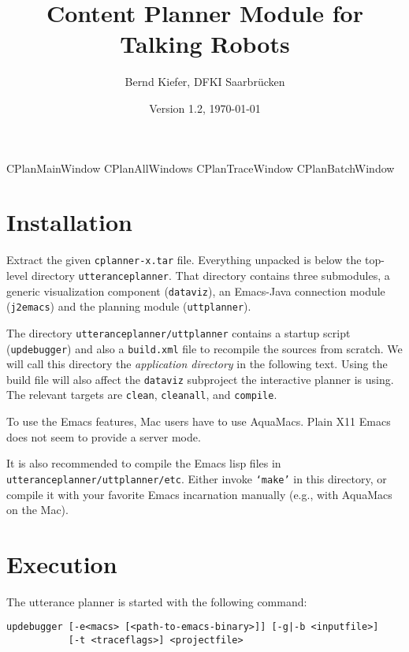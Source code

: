 \documentclass[11pt,a4paper]{article}
\title{\Large \bf Content Planner Module for Talking Robots}
\date{Version 1.2, \today}
\author{Bernd Kiefer, DFKI Saarbr\"ucken}
\begin{document}
\maketitle
\setlength{\parindent}{0em}

{CPlanMainWindow}
{CPlanAllWindows}
{CPlanTraceWindow}
{CPlanBatchWindow}

\section{Installation}

Extract the given \texttt{cplanner-x.tar} file. Everything unpacked is below
the top-level directory \texttt{utteranceplanner}. That directory contains
three submodules, a generic visualization component (\texttt{dataviz}), an
Emacs-Java connection module (\texttt{j2emacs}) and the planning module
(\texttt{uttplanner}).

The directory \texttt{utteranceplanner/uttplanner} contains a startup script
(\texttt{updebugger}) and also a \texttt{build.xml} file to recompile the
sources from scratch. We will call this directory the \emph{application
  directory} in the following text. Using the build file will also affect the
\texttt{dataviz} subproject the interactive planner is using. The relevant
targets are \texttt{clean}, \texttt{cleanall}, and \texttt{compile}.

To use the Emacs features, Mac users have to use AquaMacs. Plain X11 Emacs
does not seem to provide a server mode.

It is also recommended to compile the Emacs lisp files in \texttt{utteranceplanner/uttplanner/etc}. Either invoke
\texttt{`make'} in this directory, or compile it with your favorite Emacs
incarnation manually (e.g., with AquaMacs on the Mac).

\section{Execution}

The utterance planner is started with the following command:
\begin{verbatim}
updebugger [-e<macs> [<path-to-emacs-binary>]] [-g|-b <inputfile>]
           [-t <traceflags>] <projectfile>
\end{verbatim}
\end{document}
